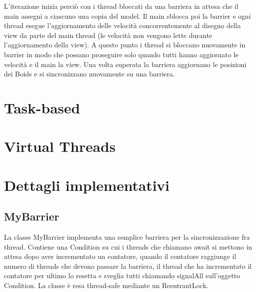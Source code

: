 \documentclass[11pt,notitlepage]{article}
\begin{document}
L'iterazione inizia perciò con i thread bloccati da una barriera in attesa che il main assegni a ciascuno una copia del model. Il main sblocca poi la barrier e ogni
thread esegue l'aggiornamento delle velocità concorrentemente al disegno della view da parte del main thread (le velocità non vengono lette durante l'aggiornamento della view).
A questo punto i thread si bloccano nuovamente in barrier in modo che possano proseguire solo quando tutti hanno aggiornato le velocità e il main la view. Una volta superata la barriera
aggiornano le posizioni dei Boids e si sincronizzano nuovamente su una barriera.

\section{Task-based}

\section{Virtual Threads}

\section{Dettagli implementativi}
\subsection{MyBarrier}
La classe \textsf{MyBarrier} implementa una semplice barriera per la sincronizzazione fra thread. Contiene una \textsf{Condition} su cui i threads che chiamano
\textsf{await} si mettono in attesa dopo aver incrementato un contatore, quando il contatore raggiunge il numero di threads che devono passare la barriera, il 
thread che ha incrementato il contatore per ultimo lo resetta e sveglia tutti chiamando \textsf{signalAll} sull'oggetto \textsf{Condition}.
La classe è resa thread-safe mediante un \textsf{ReentrantLock}.
\end{document}
